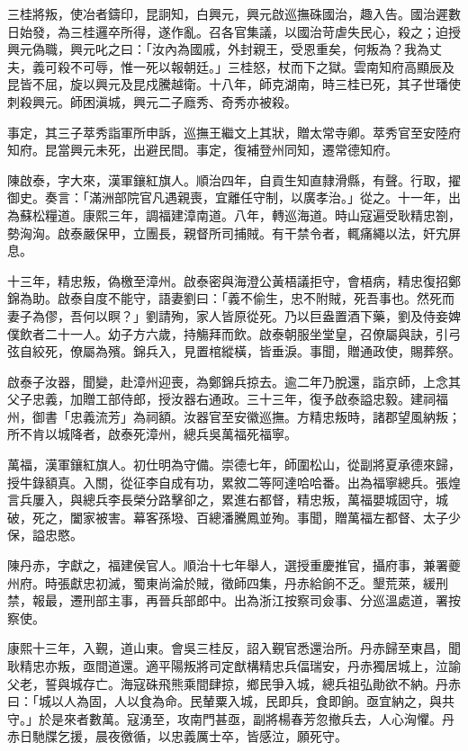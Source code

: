 \begin{pinyinscope}
三桂將叛，使冶者鑄印，昆詗知，白興元，興元啟巡撫硃國治，趣入告。國治遲數日始發，為三桂邏卒所得，遂作亂。召各官集議，以國治苛虐失民心，殺之；迫授興元偽職，興元叱之曰：「汝內為國戚，外封親王，受恩重矣，何叛為？我為丈夫，義可殺不可辱，惟一死以報朝廷。」三桂怒，杖而下之獄。雲南知府高顯辰及昆皆不屈，旋以興元及昆戍騰越衛。十八年，師克湖南，時三桂已死，其子世璠使刺殺興元。師困滇城，興元二子廕秀、奇秀亦被殺。

事定，其三子萃秀詣軍所申訴，巡撫王繼文上其狀，贈太常寺卿。萃秀官至安陸府知府。昆當興元未死，出避民間。事定，復補登州同知，遷常德知府。

陳啟泰，字大來，漢軍鑲紅旗人。順治四年，自貢生知直隸滑縣，有聲。行取，擢御史。奏言：「滿洲部院官凡遇親喪，宜離任守制，以廣孝治。」從之。十一年，出為蘇松糧道。康熙三年，調福建漳南道。八年，轉巡海道。時山寇遍受耿精忠劄，勢洶洶。啟泰嚴保甲，立團長，親督所司捕賊。有干禁令者，輒痛繩以法，奸宄屏息。

十三年，精忠叛，偽檄至漳州。啟泰密與海澄公黃梧議拒守，會梧病，精忠復招鄭錦為助。啟泰自度不能守，語妻劉曰：「義不偷生，忠不附賊，死吾事也。然死而妻子為僇，吾何以瞑？」劉請殉，家人皆原從死。乃以巨盎置酒下藥，劉及侍妾婢僕飲者二十一人。幼子方六歲，持觴拜而飲。啟泰朝服坐堂皇，召僚屬與訣，引弓弦自絞死，僚屬為殯。錦兵入，見置棺縱橫，皆垂淚。事聞，贈通政使，賜葬祭。

啟泰子汝器，聞變，赴漳州迎喪，為鄭錦兵掠去。逾二年乃脫還，詣京師，上念其父子忠義，加贈工部侍郎，授汝器右通政。三十三年，復予啟泰謚忠毅。建祠福州，御書「忠義流芳」為祠額。汝器官至安徽巡撫。方精忠叛時，諸郡望風納叛；所不肯以城降者，啟泰死漳州，總兵吳萬福死福寧。

萬福，漢軍鑲紅旗人。初仕明為守備。崇德七年，師圍松山，從副將夏承德來歸，授牛錄額真。入關，從征李自成有功，累敘二等阿達哈哈番。出為福寧總兵。張煌言兵屢入，與總兵李長榮分路擊卻之，累進右都督，精忠叛，萬福嬰城固守，城破，死之，闔家被害。幕客孫墢、百總潘騰鳳並殉。事聞，贈萬福左都督、太子少保，謚忠愍。

陳丹赤，字獻之，福建侯官人。順治十七年舉人，選授重慶推官，攝府事，兼署夔州府。時張獻忠初滅，蜀東尚淪於賊，徵師四集，丹赤給餉不乏。墾荒萊，緩刑禁，報最，遷刑部主事，再晉兵部郎中。出為浙江按察司僉事、分巡溫處道，署按察使。

康熙十三年，入覲，道山東。會吳三桂反，詔入覲官悉還治所。丹赤歸至東昌，聞耿精忠亦叛，亟間道還。適平陽叛將司定猷構精忠兵偪瑞安，丹赤獨居城上，泣諭父老，誓與城存亡。海寇硃飛熊乘間肆掠，鄉民爭入城，總兵祖弘勛欲不納。丹赤曰：「城以人為固，人以食為命。民輦粟入城，民即兵，食即餉。亟宜納之，與共守。」於是來者數萬。寇湧至，攻南門甚亟，副將楊春芳忽撤兵去，人心洶懼。丹赤日馳牒乞援，晨夜徼循，以忠義厲士卒，皆感泣，願死守。


\end{pinyinscope}
